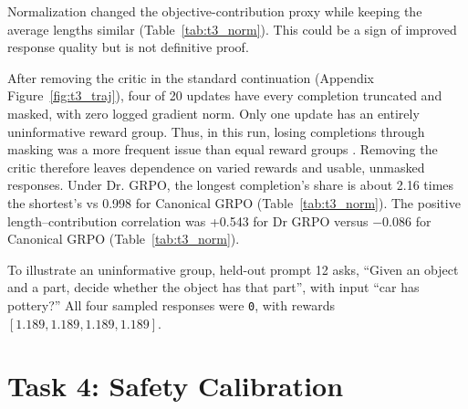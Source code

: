 \documentclass{article}
\begin{document}
 Normalization changed the objective-contribution proxy while keeping the average lengths similar (Table~\ref{tab:t3_norm}). This could be a sign of improved response quality but is not definitive proof.

 After removing the critic in the standard continuation (Appendix Figure~\ref{fig:t3_traj}), four of 20 updates have every completion truncated and masked, with zero logged gradient norm. Only one update has an entirely uninformative reward group. Thus, in this run, losing completions through masking was a more frequent issue than equal reward groups .
Removing the critic therefore leaves dependence on varied rewards and usable, unmasked responses. Under Dr. GRPO, the longest completion’s share is about 2.16 times the shortest's vs 0.998 for Canonical GRPO (Table~\ref{tab:t3_norm}). The positive length–contribution correlation was +0.543 for Dr GRPO versus $-0.086$ for Canonical GRPO (Table~\ref{tab:t3_norm}).

To illustrate an uninformative group, held-out prompt 12 asks, ``Given an object and a part, decide whether the object has that part'', with input ``car has pottery?'' All four sampled responses were \texttt{0}, with rewards $[1.189,1.189,1.189,1.189]$.

\begin{table}[htbp]
    \centering
    \caption{Normalization Comparison: Held-out evaluation ($n=20$ prompts, $K=4$) and length-conditioned gradient allocation statistics across matched 8-update forks.}
    \label{tab:t3_norm}
    \small
\end{table}

\section{Task 4: Safety Calibration}
\label{sec:task4}
\end{document}
